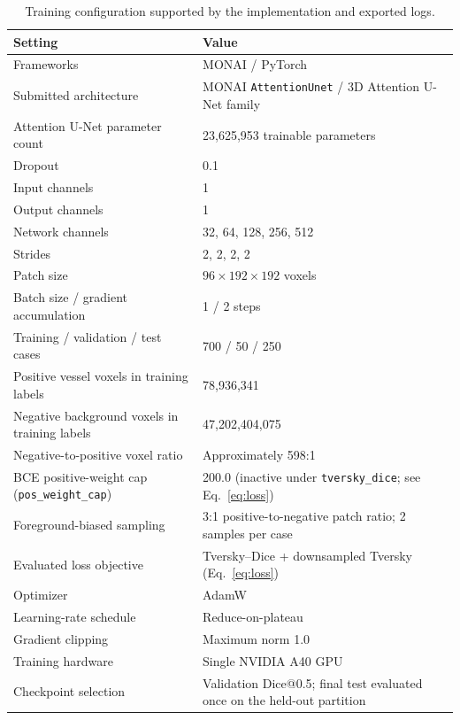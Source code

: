 \documentclass[anonymous]{iopjournal}
\begin{document}
\begin{table}[!htbp]
\centering
\caption{Training configuration supported by the implementation and exported logs.}
\label{tab:training}
\begin{threeparttable}
\footnotesize
\begin{tabularx}{0.92\textwidth}{L{0.42\textwidth}Y}
\toprule
\textbf{Setting} & \textbf{Value} \\
\midrule
Frameworks & MONAI / PyTorch \\
Submitted architecture & MONAI \texttt{AttentionUnet} / 3D Attention U-Net family \\
Attention U-Net parameter count & 23,625,953 trainable parameters \\
Dropout & 0.1 \\
Input channels & 1 \\
Output channels & 1 \\
Network channels & 32, 64, 128, 256, 512 \\
Strides & 2, 2, 2, 2 \\
Patch size & $96\times192\times192$ voxels \\
Batch size / gradient accumulation & 1 / 2 steps \\
Training / validation / test cases & 700 / 50 / 250 \\
Positive vessel voxels in training labels & 78,936,341 \\
Negative background voxels in training labels & 47,202,404,075 \\
Negative-to-positive voxel ratio & Approximately 598:1 \\
BCE positive-weight cap (\texttt{pos\_weight\_cap}) & 200.0 (inactive under \texttt{tversky\_dice}; see Eq.~\ref{eq:loss}) \\
Foreground-biased sampling & 3:1 positive-to-negative patch ratio; 2 samples per case \\
Evaluated loss objective & Tversky--Dice + downsampled Tversky (Eq.~\ref{eq:loss}) \\
Optimizer & AdamW \\
Learning-rate schedule & Reduce-on-plateau \\
Gradient clipping & Maximum norm 1.0 \\
Training hardware & Single NVIDIA A40 GPU \\
Checkpoint selection & Validation Dice@0.5; final test evaluated once on the held-out partition \\
\bottomrule
\end{tabularx}
\end{threeparttable}
\end{table}
\end{document}
